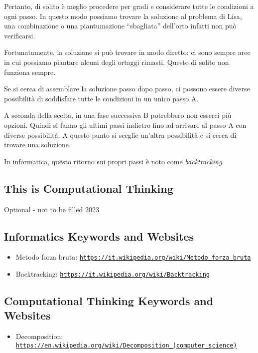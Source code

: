 \documentclass[a4paper,11pt]{report}
\newcommand{\BrochureUrlText}[1]{\texttt{#1}}
\newcommand{\taskGraphicsFolder}{..}
\begin{document}
Pertanto, di solito è meglio procedere per gradi e considerare tutte le condizioni a ogni passo. In questo modo possiamo trovare la soluzione al problema di Lisa, una combinazione o una piantumazione \enquote{sbagliata} dell’orto infatti non può verificarsi.

Fortunatamente, la soluzione si può trovare in modo diretto: ci sono sempre aree in cui possiamo piantare alcuni degli ortaggi rimasti. Questo di solito non funziona sempre.

Se si cerca di assemblare la soluzione passo dopo passo, ci possono essere diverse possibilità di soddisfare tutte le condizioni in un unico passo A.

{\centering%
\par}

A seconda della scelta, in una fase successiva B potrebbero non esserci più opzioni. Quindi si fanno gli ultimi passi indietro fino ad arrivare al passo A con diverse possibilità. A questo punto si sceglie un’altra possibilità e si cerca di trovare una soluzione.

In informatica, questo ritorno sui propri passi è noto come \emph{backtracking}.


\subsection*{This is Computational Thinking}

Optional - not to be filled 2023


\subsection*{Informatics Keywords and Websites}

\begin{itemize}
  \item Metodo forza bruta: \href{https://it.wikipedia.org/wiki/Metodo_forza_bruta}{\BrochureUrlText{https://it.wikipedia.org/wiki/Metodo\_forza\_bruta}}
  \item Backtracking: \href{https://it.wikipedia.org/wiki/Backtracking}{\BrochureUrlText{https://it.wikipedia.org/wiki/Backtracking}}
\end{itemize}


\subsection*{Computational Thinking Keywords and Websites}

\begin{itemize}
  \item Decomposition: \href{https://en.wikipedia.org/wiki/Decomposition_(computer_science)}{\BrochureUrlText{https://en.wikipedia.org/wiki/Decomposition\_(computer\_science)}}
\end{itemize}
\end{document}
